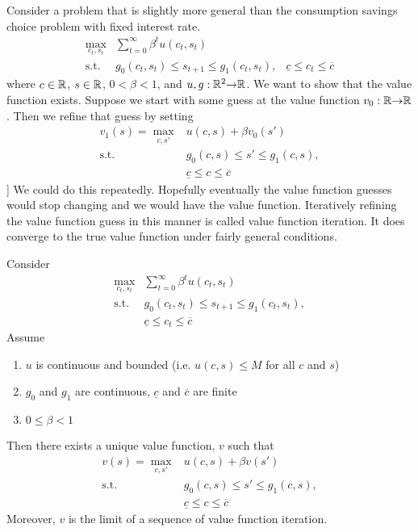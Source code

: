 Consider a problem that is slightly more general than the consumption
savings choice problem with fixed interest rate.
\begin{align*}
  \max_{c_t,s_t} & \sum_{t=0}^\infty \beta^t u(c_t,s_t) \\
  \text{s.t.} & g_0(c_t,s_t) \leq s_{t+1} \leq g_1(c_t,s_t),
  & \underline{c} \leq c_t \leq \overline{c}
\end{align*}
where $c \in \mathbb{R}$, $s \in \mathbb{R}$, $0<\beta<1$, and $u,g:\mathbb{R}^2 {\rightarrow} \mathbb{R}$.
We want to show that the value function exists. Suppose we start with
some guess at the value function $v_0:\mathbb{R}{\rightarrow} \mathbb{R}$. Then we refine that guess by
setting 
\begin{align*} 
  v_1(s) = \max_{c,s'} & u(c,s) + \beta v_0(s') \\
           \text{s.t.} & g_0(c,s) \leq s' \leq g_1(c,s),\\
                       & \underline{c} \leq c \leq \overline{c}
\end{align*}]
We could do this repeatedly. Hopefully eventually the value function guesses
would stop changing and we would have the value function. Iteratively 
refining the value function guess in this manner is called value
function iteration. It does converge to the true value function under
fairly general conditions.
\begin{theorem}
  Consider 
  \begin{align*}
    \max_{c_t,s_t} & \sum_{t=0}^\infty \beta^t u(c_t,s_t) \\
    \text{s.t.} & g_0(c_t,s_t) \leq s_{t+1} \leq g_1(c_t,s_t), \\
    & \underline{c} \leq c_t \leq \overline{c}
  \end{align*}
  Assume 
  \begin{enumerate}
  \item $u$ is continuous and bounded (i.e. $u(c,s) \leq M$ for all
    $c$ and $s$)
  \item $g_0$ and $g_1$ are continuous, $\underline{c}$ and
    $\overline{c}$ are finite
  \item $0 \leq \beta < 1$
  \end{enumerate}
  Then there exists a unique value function, $v$ such that
  \begin{align*} v(s) = \max_{c,s'} & u(c,s) + \beta v(s') \\
    \text{s.t.} & g_0(c,s) \leq s' \leq g_1(c,s),\\
    & \underline{c} \leq c \leq \overline{c}
  \end{align*}
  Moreover, $v$ is the limit of a sequence of value function
  iteration.
\end{theorem}

